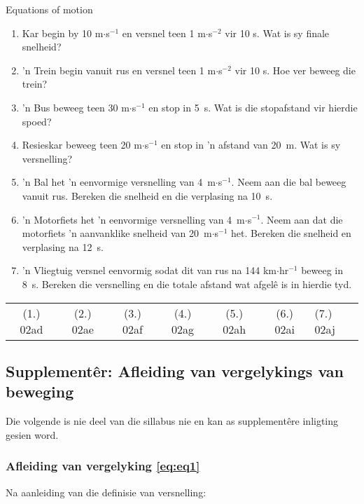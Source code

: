 \noindent
\begin{exercises}{Equations of motion}
\nopagebreak \noindent
\begin{enumerate}[noitemsep, label=\textbf{\arabic*}. ] 
    \item \n Kar begin by 10 m$\ensuremath{\cdot}$s${}^{-1}$ en versnel teen 1 m$\ensuremath{\cdot}$s${}^{-2}$ vir 10 s. Wat is sy finale snelheid?
    \item 'n Trein begin vanuit rus en versnel teen 1 m$\ensuremath{\cdot}$s${}^{-2}$ vir 10 s. Hoe ver beweeg die trein?
\item 'n Bus beweeg teen 30 m$\ensuremath{\cdot}$s${}^{-1}$ en stop in 5~s. Wat is die stopafstand vir hierdie spoed?
\item \n Resieskar beweeg teen 20 m$\ensuremath{\cdot}$s${}^{-1}$ en stop in 'n afstand van 20~m. Wat is sy versnelling? 
\item 'n Bal het 'n eenvormige versnelling van 4~m$\ensuremath{\cdot}$s${}^{-1}$. Neem aan die bal beweeg vanuit rus. Bereken die snelheid en die verplasing na 10~s.
\item 'n Motorfiets het 'n eenvormige versnelling van 4~m$\ensuremath{\cdot}$s${}^{-1}$. Neem aan dat die motorfiets 'n aanvanklike snelheid van 20~m$\ensuremath{\cdot}$s${}^{-1}$ het. Bereken die snelheid en verplasing na 12~s.\newline
\item 'n Vliegtuig versnel eenvormig sodat dit van rus na 144 km$\ensuremath{\cdot}$hr${}^{-1}$ beweeg in 8~s. Bereken die versnelling en die totale afstand wat afgel\^e is in hierdie tyd.
\end{enumerate}
    \label{m38796*cid11}
\practiceinfo
 \par \begin{tabular}[h]{cccccc}
 (1.) 02ad  &  (2.) 02ae  &  (3.) 02af  &  (4.) 02ag  &  (5.) 02ah  &  (6.) 02ai  & (7.) 02aj \end{tabular}
\end{exercises}

\subsection*{Supplement\^er: Afleiding van vergelykings van beweging}
\nopagebreak
Die volgende is nie deel van die sillabus nie en kan as supplement\^ere inligting gesien word.\par
            
\subsubsection*{Afleiding van vergelyking \ref{eq:eq1}}
\nopagebreak
Na aanleiding van die definisie van versnelling:\par 
\label{m38796*id76246}\nopagebreak\noindent{}
            
